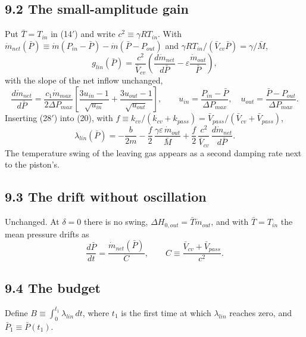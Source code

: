 \documentclass[11pt]{article}
\begin{document}
\subsection*{9.2 The small-amplitude gain}

Put $\bar T = T_{in}$ in (14$'$) and write $c^2 \equiv \gamma RT_{in}$. With $\dot m_{net}(\bar P) \equiv \dot m(P_{in} - \bar P) - \dot m(\bar P - P_{out})$ and $\gamma RT_{in}/(\bar V_{cv}\bar P) = \gamma/\bar M$,
\begin{equation}
g_{lin}(\bar P) = \frac{c^2}{\bar V_{cv}}\left(\frac{d\dot m_{net}}{d\bar P} - \varepsilon\frac{\dot m_{out}}{\bar P}\right) , \tag{28$'$}
\end{equation}
with the slope of the net inflow unchanged,
\begin{equation}
\frac{d\dot m_{net}}{d\bar P} = \frac{c_1\dot m_{max}}{2\Delta P_{max}}\left[\frac{3u_{in}-1}{\sqrt{u_{in}}} + \frac{3u_{out}-1}{\sqrt{u_{out}}}\right], \qquad u_{in} = \frac{P_{in} - \bar P}{\Delta P_{max}}, \quad u_{out} = \frac{\bar P - P_{out}}{\Delta P_{max}} . \tag{29}
\end{equation}
Inserting (28$'$) into (20), with $f \equiv k_{cv}/(k_{cv} + k_{pass}) = \bar V_{pass}/(\bar V_{cv} + \bar V_{pass})$,
\begin{equation}
\lambda_{lin}(\bar P) = -\frac{b}{2m} - \frac{f}{2}\,\frac{\gamma\varepsilon\,\dot m_{out}}{\bar M} + \frac{f}{2}\,\frac{c^2}{\bar V_{cv}}\,\frac{d\dot m_{net}}{d\bar P} . \tag{30$'$}
\end{equation}
The temperature swing of the leaving gas appears as a second damping rate next to the piston's.

\subsection*{9.3 The drift without oscillation}

Unchanged. At $\delta = 0$ there is no swing, $\Delta H_{0,out} = \bar T\dot m_{out}$, and with $\bar T = T_{in}$ the mean pressure drifts as
\begin{equation}
\frac{d\bar P}{dt} = \frac{\dot m_{net}(\bar P)}{C}, \qquad C \equiv \frac{\bar V_{cv} + \bar V_{pass}}{c^2} . \tag{31}
\end{equation}

\subsection*{9.4 The budget}

Define $B \equiv \int_0^{t_1}\lambda_{lin}\,dt$, where $t_1$ is the first time at which $\lambda_{lin}$ reaches zero, and $\bar P_1 \equiv \bar P(t_1)$.
\end{document}
